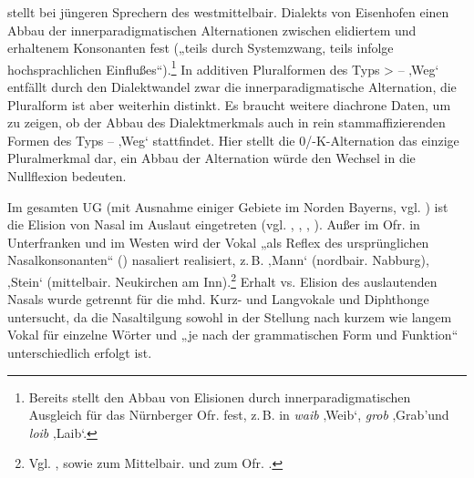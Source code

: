 \citet[19]{White1966} stellt bei jüngeren Sprechern des westmittelbair. Dialekts von Eisenhofen einen Abbau der innerparadigmatischen Alternationen zwischen elidiertem und erhaltenem Konsonanten fest („teils durch Systemzwang, teils infolge hochsprachlichen Einflußes“).\footnote{Bereits \citet[§111.2b]{Gebhardt1907} stellt den Abbau von Elisionen durch innerparadigmatischen Ausgleich für das Nürnberger Ofr. fest, z.\,B. in \textit{waib} ‚Weib‘, \textit{grob} ‚Grab’und \textit{loib} ‚Laib‘.} In additiven Pluralformen des Typs  >  --  ‚Weg‘ \citep[45]{White1966} entfällt durch den Dialektwandel zwar die innerparadigmatische Alternation, die Pluralform ist aber weiterhin distinkt. Es braucht weitere diachrone Daten, um zu zeigen, ob der Abbau des Dialektmerkmals auch in rein stammaffizierenden Formen des Typs  --  ‚Weg‘ stattfindet. Hier stellt die 0/-K-Alternation das einzige Pluralmerkmal dar, ein Abbau der Alternation würde den Wechsel in die Nullflexion bedeuten.


Im gesamten UG (mit Ausnahme einiger Gebiete im Norden Bayerns, vgl. \citealt[59]{RennKönig2006}) ist die Elision von Nasal im Auslaut eingetreten (vgl. \citealt[§46]{Kranzmayer1956}, \citealt[125]{Rowley1997}, \citealt[112]{Roth1940}, \citealt[385]{Schirmunski1962}). Außer im Ofr. in Unterfranken und im Westen wird der Vokal „als Reflex des ursprünglichen Nasalkonsonanten“ (\citealt[59]{RennKönig2006}) nasaliert realisiert, z.\,B.  ‚Mann‘ (nordbair. Nabburg),  ‚Stein‘ (mittelbair. Neukirchen am Inn).\footnote{Vgl. \citet[74]{Rowley1997}, \citet[128]{Schmeller1821} sowie \citet[11]{Schießl1909} zum Mittelbair. und zum Ofr. \citet[§95.1]{Gebhardt1907}.}  Erhalt vs. Elision des auslautenden Nasals wurde getrennt für die mhd. Kurz- und Langvokale und Diphthonge untersucht, da die Nasaltilgung sowohl in der Stellung nach kurzem wie langem Vokal für einzelne Wörter und „je nach der grammatischen Form und Funktion“ \citep[385]{Schirmunski1962} unterschiedlich erfolgt ist.

